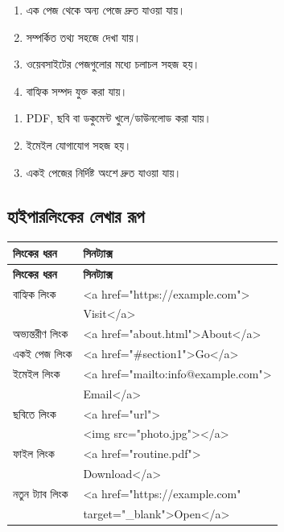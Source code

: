 \par\noindent
\begin{minipage}[t]{.48\linewidth}\vspace{0pt}
\begin{enumerate}
\item এক পেজ থেকে অন্য পেজে দ্রুত যাওয়া যায়।
\item সম্পর্কিত তথ্য সহজে দেখা যায়।
\item ওয়েবসাইটের পেজগুলোর মধ্যে চলাচল সহজ হয়।
\item বাহ্যিক সম্পদ যুক্ত করা যায়।
\end{enumerate}
\end{minipage}\hfill
\begin{minipage}[t]{.48\linewidth}\vspace{0pt}
\begin{enumerate}
\item PDF, ছবি বা ডকুমেন্ট খুলে/ডাউনলোড করা যায়।
\item ইমেইল যোগাযোগ সহজ হয়।
\item একই পেজের নির্দিষ্ট অংশে দ্রুত যাওয়া যায়।
\end{enumerate}
\end{minipage}\par


\subsection{হাইপারলিংকের লেখার রূপ}

\begingroup
\setlength{\LTpre}{2pt}\setlength{\LTpost}{2pt}
\begin{longtable}{|p{}|p{}|}
\hline
\textbf{লিংকের ধরন} & \textbf{সিনট্যাক্স} \\
\hline
\endfirsthead
\hline
\textbf{লিংকের ধরন} & \textbf{সিনট্যাক্স} \\
\hline
\endhead
বাহ্যিক লিংক & {\footnotesize\ttfamily <a href="https://example.com">}\\
& {\footnotesize\ttfamily Visit</a>} \\
\hline
অভ্যন্তরীণ লিংক & {\footnotesize\ttfamily <a href="about.html">About</a>} \\
\hline
একই পেজ লিংক & {\footnotesize\ttfamily <a href="\#section1">Go</a>} \\
\hline
ইমেইল লিংক & {\footnotesize\ttfamily <a href="mailto:info@example.com">}\\
& {\footnotesize\ttfamily Email</a>} \\
\hline
ছবিতে লিংক & {\footnotesize\ttfamily <a href="url">}\\
& {\footnotesize\ttfamily <img src="photo.jpg"></a>} \\
\hline
ফাইল লিংক & {\footnotesize\ttfamily <a href="routine.pdf">}\\
& {\footnotesize\ttfamily Download</a>} \\
\hline
নতুন ট্যাব লিংক & {\footnotesize\ttfamily <a href="https://example.com"}\\
& {\footnotesize\ttfamily target="\_blank">Open</a>} \\
\hline
\end{longtable}
\endgroup


